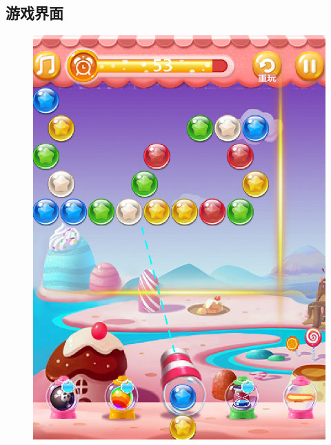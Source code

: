 \documentclass{article}
\begin{document}
        \subsection{游戏界面}
        \begin{figure}[H]
            \centering
            \includegraphics[scale=0.5]{playScene.png}
        \end{figure}
\end{document}
